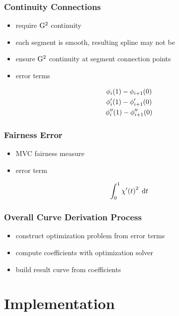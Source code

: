 \documentclass[mathserif]{beamer}
\begin{document}
		\begin{frame}
			\frametitle{Continuity Connections}
			\begin{itemize}
				\item require \(\mathrm{G}^{2}\) continuity
				\item each segment is smooth, resulting spline may not be
				\item ensure \(\mathrm{G}^{2}\) continuity at segment connection points
				\item error terms
			\end{itemize}
			\begin{equation*}
				\begin{gathered}
					\phi_i\!\left( 1 \right) - \phi_{i + 1}\!\left( 0 \right)\\
					\phi'_i\!\left( 1 \right) - \phi'_{i + 1}\!\left( 0 \right)\\
					\phi''_i\!\left( 1 \right) - \phi''_{i + 1}\!\left( 0 \right)
				\end{gathered}
			\end{equation*}
		\end{frame}

		\begin{frame}
			\frametitle{Fairness Error}
			\begin{itemize}
				\item MVC fairness measure
				\item error term
			\end{itemize}
			\begin{equation*}
				\int_{0}^{1} \chi'\!\left( t \right)^2 \; \mathrm{d}t
			\end{equation*}
		\end{frame}

		\begin{frame}
			\frametitle{Overall Curve Derivation Process}
			\begin{itemize}
				\item construct optimization problem from error terms
				\item compute coefficients with optimization solver
				\item build result curve from coefficients
			\end{itemize}
		\end{frame}

	\section{Implementation}
\end{document}
